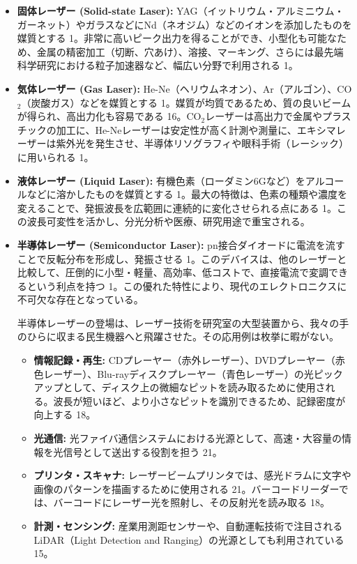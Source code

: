 \documentclass[11pt,a4paper]{ltjsarticle}
\begin{document}
\begin{itemize}
\item \textbf{固体レーザー (Solid-state Laser):} YAG（イットリウム・アルミニウム・ガーネット）やガラスなどにNd（ネオジム）などのイオンを添加したものを媒質とする 1。非常に高いピーク出力を得ることができ、小型化も可能なため、金属の精密加工（切断、穴あけ）、溶接、マーキング、さらには最先端科学研究における粒子加速器など、幅広い分野で利用される 1。

\item \textbf{気体レーザー (Gas Laser):} He-Ne（ヘリウムネオン）、Ar（アルゴン）、CO$_2$（炭酸ガス）などを媒質とする 1。媒質が均質であるため、質の良いビームが得られ、高出力化も容易である 16。CO$_2$レーザーは高出力で金属やプラスチックの加工に、He-Neレーザーは安定性が高く計測や測量に、エキシマレーザーは紫外光を発生させ、半導体リソグラフィや眼科手術（レーシック）に用いられる 1。

\item \textbf{液体レーザー (Liquid Laser):} 有機色素（ローダミン6Gなど）をアルコールなどに溶かしたものを媒質とする 1。最大の特徴は、色素の種類や濃度を変えることで、発振波長を広範囲に連続的に変化させられる点にある 1。この波長可変性を活かし、分光分析や医療、研究用途で重宝される。

\item \textbf{半導体レーザー (Semiconductor Laser):} pn接合ダイオードに電流を流すことで反転分布を形成し、発振させる 1。このデバイスは、他のレーザーと比較して、圧倒的に小型・軽量、高効率、低コストで、直接電流で変調できるという利点を持つ 1。この優れた特性により、現代のエレクトロニクスに不可欠な存在となっている。

半導体レーザーの登場は、レーザー技術を研究室の大型装置から、我々の手のひらに収まる民生機器へと飛躍させた。その応用例は枚挙に暇がない。

\begin{itemize}
\item \textbf{情報記録・再生:} CDプレーヤー（赤外レーザー）、DVDプレーヤー（赤色レーザー）、Blu-rayディスクプレーヤー（青色レーザー）の光ピックアップとして、ディスク上の微細なピットを読み取るために使用される。波長が短いほど、より小さなピットを識別できるため、記録密度が向上する 18。

\item \textbf{光通信:} 光ファイバ通信システムにおける光源として、高速・大容量の情報を光信号として送出する役割を担う 21。

\item \textbf{プリンタ・スキャナ:} レーザービームプリンタでは、感光ドラムに文字や画像のパターンを描画するために使用される 21。バーコードリーダーでは、バーコードにレーザー光を照射し、その反射光を読み取る 18。

\item \textbf{計測・センシング:} 産業用測距センサーや、自動運転技術で注目されるLiDAR（Light Detection and Ranging）の光源としても利用されている 15。
\end{itemize}
\end{itemize}
\end{document}
